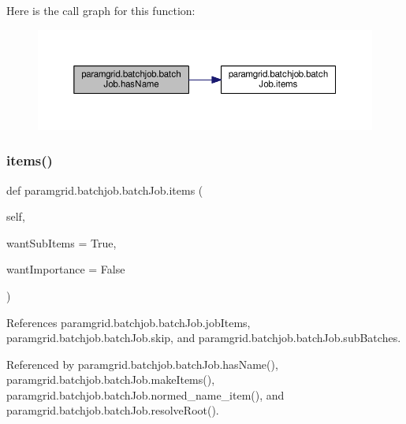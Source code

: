 Here is the call graph for this function\+:
\nopagebreak
\begin{figure}[H]
\begin{center}
\leavevmode
\includegraphics[width=350pt]{classparamgrid_1_1batchjob_1_1batchJob_a51f5136c448e61a252384d376d57796e_cgraph}
\end{center}
\end{figure}
\mbox{\label{classparamgrid_1_1batchjob_1_1batchJob_a00d5bd2488a8806f4fb864d54fe01a7e}} 
\subsubsection{\texorpdfstring{items()}{items()}}
{\footnotesize\ttfamily def paramgrid.\+batchjob.\+batch\+Job.\+items (\begin{DoxyParamCaption}\item[{}]{self,  }\item[{}]{want\+Sub\+Items = {\ttfamily True},  }\item[{}]{want\+Importance = {\ttfamily False} }\end{DoxyParamCaption})}



References paramgrid.\+batchjob.\+batch\+Job.\+job\+Items, paramgrid.\+batchjob.\+batch\+Job.\+skip, and paramgrid.\+batchjob.\+batch\+Job.\+sub\+Batches.



Referenced by paramgrid.\+batchjob.\+batch\+Job.\+has\+Name(), paramgrid.\+batchjob.\+batch\+Job.\+make\+Items(), paramgrid.\+batchjob.\+batch\+Job.\+normed\+\_\+name\+\_\+item(), and paramgrid.\+batchjob.\+batch\+Job.\+resolve\+Root().


